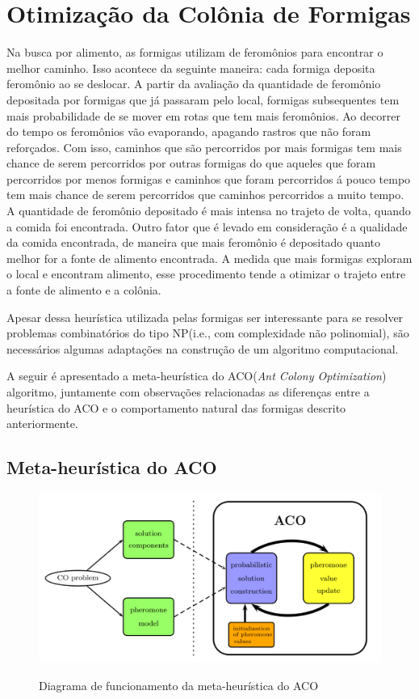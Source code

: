 \section{Otimização da Colônia de Formigas}

Na busca por alimento, as formigas utilizam de feromônios para encontrar o melhor caminho.
Isso acontece da seguinte maneira: cada formiga deposita feromônio ao se deslocar. A partir
da avaliação da quantidade de feromônio depositada por formigas que já passaram pelo local,
formigas subsequentes tem mais probabilidade de se mover em rotas que tem mais feromônios. Ao
decorrer do tempo os feromônios vão evaporando, apagando rastros que não foram reforçados. 
Com isso, caminhos que são percorridos por mais formigas tem mais chance de serem 
percorridos por outras formigas do que aqueles que foram percorridos por menos formigas e 
caminhos que foram percorridos á pouco tempo tem mais chance de serem percorridos que caminhos
percorridos a muito tempo. A quantidade de feromônio depositado é mais intensa no trajeto de volta,
quando a comida foi encontrada. Outro fator que é levado em consideração é a qualidade da comida
encontrada, de maneira que mais feromônio é depositado quanto melhor for a fonte de alimento encontrada.
A medida que mais formigas exploram o local e encontram alimento, esse procedimento tende a otimizar o
trajeto entre a fonte de alimento e a colônia.

Apesar dessa heurística utilizada pelas formigas ser interessante para se resolver problemas combinatórios 
do tipo NP(i.e., com complexidade não polinomial), são necessários algumas adaptações na construção
de um algoritmo computacional.

A seguir é apresentado a meta-heurística do ACO(\textit{Ant Colony Optimization}) algoritmo,
juntamente com observações relacionadas as diferenças entre a heurística do ACO e o
comportamento natural das formigas descrito anteriormente.

\subsection{Meta-heurística do ACO}

\begin{figure}[h]
  \includegraphics[width = 0.9 \linewidth]{imgs/meta_heuristica_aco}
  \label{diagrama_metaheuristica_aco}
  \caption{Diagrama de funcionamento da meta-heurística do ACO \cite{blum2005aco}}
\end{figure}

